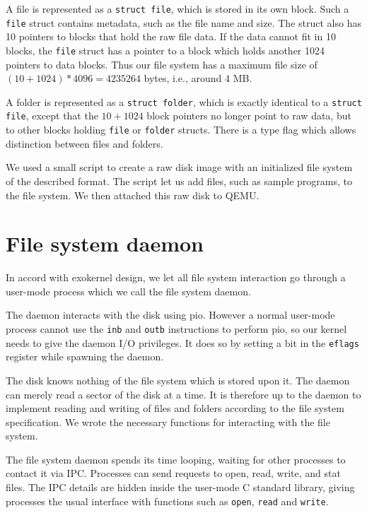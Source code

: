 \documentclass{report}
\begin{document}

A file is represented as a \texttt{struct file}, which is stored in its own
block. Such a \texttt{file} struct contains metadata, such as the file name
and size. The struct also has 10 pointers to blocks that hold the raw file
data. If the data cannot fit in 10 blocks, the \texttt{file} struct has a
pointer to a block which holds another 1024 pointers to data blocks. Thus our
file system has a maximum file size of $(10+1024)*4096 = 4235264$ bytes, i.e.,
around 4 MB.


A folder is represented as a \texttt{struct folder}, which is exactly
identical to a \texttt{struct file}, except that the $10+1024$ block pointers
no longer point to raw data, but to other blocks holding \texttt{file} or
\texttt{folder} structs. There is a type flag which allows distinction between
files and folders.

We used a small script to create a raw disk image with an initialized file
system of the described format. The script let us add files, such as sample
programs, to the file system. We then attached this raw disk to QEMU.



\section{File system daemon}
In accord with exokernel design, we let all file system interaction go through
a user-mode process which we call the file system daemon.

The daemon interacts with the disk using \gls{pio}. However a normal user-mode
process cannot use the \texttt{inb} and \texttt{outb} instructions to perform
\gls{pio}, so our kernel needs to give the daemon I/O privileges. It does so
by setting a bit in the \texttt{eflags} register while spawning the daemon.

The disk knows nothing of the file system which is stored upon it. The daemon
can merely read a sector of the disk at a time. It is therefore up to the
daemon to implement reading and writing of files and folders according to the
file system specification. We wrote the necessary functions for interacting
with the file system.

The file system daemon spends its time looping, waiting for other processes to
contact it via IPC. Processes can send requests to open, read, write,
and stat files. The IPC details are hidden inside the user-mode C standard
library, giving processes the usual interface with functions such as
\texttt{open}, \texttt{read} and \texttt{write}.
\end{document}
